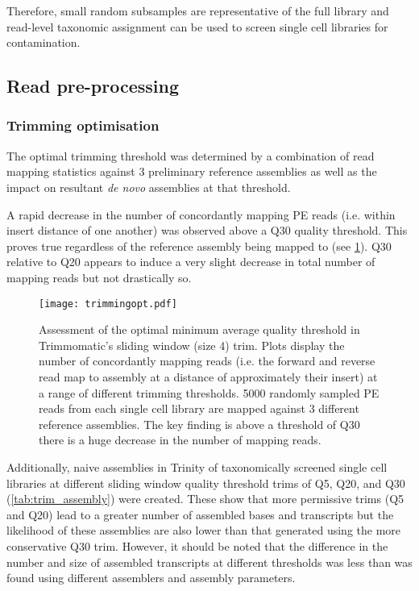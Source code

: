 Therefore, small random subsamples are representative of the full library and
read-level taxonomic assignment can be used to screen single cell libraries for contamination.


\subsection{Read pre-processing} 

\subsubsection{Trimming optimisation}

The optimal trimming threshold was determined by a combination
of read mapping statistics against 3 preliminary reference assemblies
as well as the impact on resultant \textit{de novo} assemblies at 
that threshold.

A rapid decrease in the number of concordantly mapping PE reads (i.e.
within insert distance of one another) was observed above a Q30 quality threshold.
This proves true regardless of the reference assembly being mapped to
(see \cref{fig:trimmingopt}).  Q30 relative to Q20 appears to induce a 
very slight decrease in total number of mapping reads but not drastically so. 

\begin{figure}[hp]
	\centering
    \texttt{[image: trimmingopt.pdf]}
    \caption[Assessment of optimal trimming thresholds]{Assessment of the optimal minimum average quality threshold
             in Trimmomatic's sliding window (size 4) trim.  Plots
             display the number of concordantly mapping reads (i.e. the forward
                 and reverse read map to assembly at a distance of approximately
                 their insert)
             at a range of different trimming
             thresholds.  5000 randomly sampled PE reads 
             from each single cell library are mapped against 3 different 
             reference assemblies. 
             The key finding is above a threshold of Q30 there is a huge
         decrease in the number of mapping reads.}
         \label{fig:trimmingopt}
\end{figure}

Additionally, naive assemblies in Trinity of taxonomically screened single cell libraries
at different sliding window quality threshold trims of Q5, Q20, and Q30 (\cref{tab:trim_assembly})
were created. 
These show that more permissive trims (Q5 and Q20) lead to a greater number of assembled bases and transcripts 
but the likelihood of these assemblies are also lower than that generated using the 
more conservative Q30 trim. 
However, it should be noted that the difference in the number and size of assembled transcripts at different thresholds 
was less than was found using different assemblers and assembly parameters.

